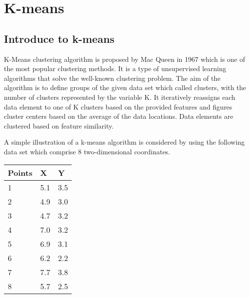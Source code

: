 \section{K-means}
\subsection{Introduce to k-means}
\forceindent K-Means clustering algorithm is proposed by Mac Queen in 1967 which is one of the most popular clustering methods. It is a type of unsupervised learning algorithms that solve the well-known clustering problem. The aim of the algorithm is to define groups of the given data set which called clusters, with the number of clusters represented by the variable K. It iteratively reassigns each data element to one of K clusters based on the provided features and figures cluster centers based on the average of the data locations. Data elements are clustered based on feature similarity.

A simple illustration of a k-means algorithm is considered by using the following data set which comprise 8 two-dimensional coordinates.
\begin{center}
	\begin{tabular}{ | l | l | l |}
		\hline
		Points & X & Y \\ \hline
		1 & 5.1 & 3.5 \\ \hline
		2 & 4.9 & 3.0 \\ \hline
		3 & 4.7 & 3.2 \\ \hline
		4 & 7.0 & 3.2 \\ \hline
		5 & 6.9 & 3.1 \\ \hline
		6 & 6.2 & 2.2 \\ \hline
		7 & 7.7 & 3.8 \\ \hline
		8 & 5.7 & 2.5 \\ \hline
	\end{tabular}
\end{center}

